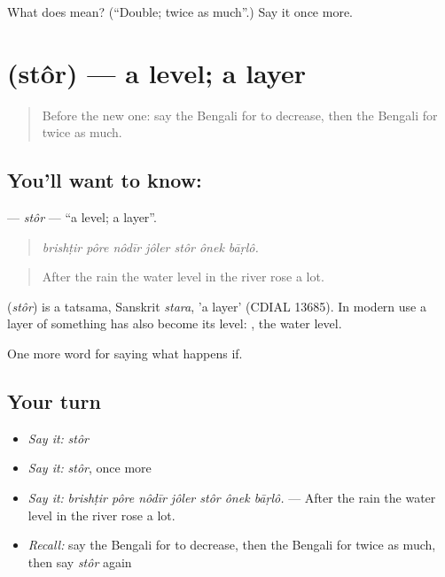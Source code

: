 \begin{tcolorbox}[breakable,colback=teal!4,colframe=teal!35!black,title={Before you move on}]
What does  mean? (\textquotedblleft{}Double; twice as much\textquotedblright{}.) Say it once more.
\end{tcolorbox}
\section[\texorpdfstring{\bn{স্তর} (stôr)}{স্তর (stôr)}]{ (stôr) — a level; a layer}

\label{lesson:BN-C372-stor}



\begin{quote}
Before the new one: say the Bengali for to decrease, then the Bengali for twice as much.
\end{quote}

\subsection*{You'll want to know: }
\textbf{} — \emph{stôr} — \textquotedblleft{}a level; a layer\textquotedblright{}.

\begin{quote}
      
\end{quote}

\begin{quote}
\emph{brishṭir pôre nôdīr jôler stôr ônek bāṛlô.}
\end{quote}

\begin{quote}
After the rain the water level in the river rose a lot.
\end{quote}

\begin{cousinweb}
\textbf{} (\emph{stôr}) is a tatsama, Sanskrit \emph{stara}, 'a layer' (CDIAL 13685). In modern use a layer of something has also become its level:  , the water level.
\end{cousinweb}

\begin{grammarlens}[title={What you've built}]
One more word for saying what happens if.
\end{grammarlens}

\subsection*{Your turn}
\begin{itemize}
\raggedright
  \item \emph{Say it:} \emph{stôr}
  \item \emph{Say it:} \emph{stôr}, once more
  \item \emph{Say it:} \emph{brishṭir pôre nôdīr jôler stôr ônek bāṛlô.} — After the rain the water level in the river rose a lot.
  \item \emph{Recall:} say the Bengali for to decrease, then the Bengali for twice as much, then say \emph{stôr} again
\end{itemize}

